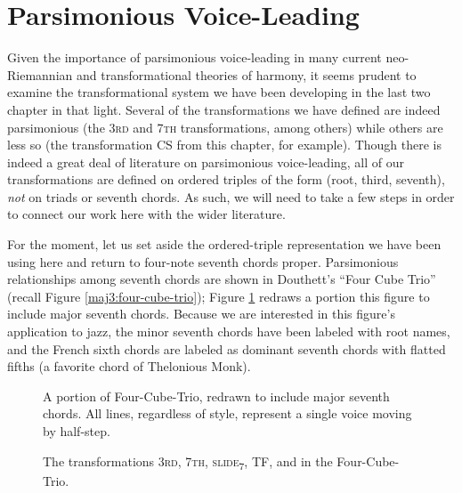 \section{Parsimonious Voice-Leading}
\label{sec:parsimony}

Given the importance of parsimonious voice-leading in many current
neo-Riemannian and transformational theories of harmony, it seems prudent to
examine the transformational system we have been developing in the last two
chapter in that light. Several of the transformations we have defined are
indeed parsimonious (the \textsc{3rd} and \textsc{7th} transformations, among
others) while others are less so (the transformation CS from this chapter, for
example). Though there is indeed a great deal of literature on parsimonious
voice-leading, all of our transformations are defined on ordered
triples of the form (root, third, seventh), \emph{not} on triads or seventh
chords. As such, we will need to take a few steps in order to connect our work
here with the wider literature.

For the moment, let us set aside the ordered-triple representation we have
been using here and return to four-note seventh chords proper. Parsimonious
relationships among seventh chords are shown in Douthett's ``Four Cube Trio''
(recall Figure \ref{maj3:four-cube-trio}); Figure \ref{pvl:four-cube-correct}
redraws a portion this figure to include major seventh chords.
Because we are interested in this figure's application to jazz, the minor
seventh chords have been labeled with root names, and the French sixth chords
are labeled as dominant seventh chords with flatted fifths (a favorite chord of
Thelonious Monk).

\begin{figure}[tbp]
  \caption[A portion of Four-Cube-Trio, redrawn to include major seventh
  chords.]{A portion of Four-Cube-Trio, redrawn to include major seventh
    chords. All lines, regardless of style, represent a single voice moving by
    half-step.}
  \label{pvl:four-cube-correct}
\end{figure}

\begin{figure}[tbp]
  \caption{The transformations 3\textsc{rd}, 7\textsc{th},
    \textsc{slide}\textsubscript{7}, TF, and \tft in the Four-Cube-Trio.}
  \label{pvl:four-cube-transformations}
\end{figure}

